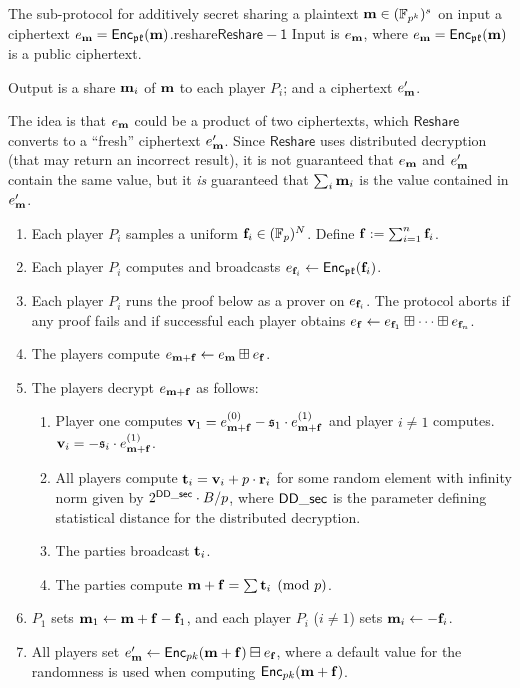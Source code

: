 \begin{Boxfig}{The sub-protocol for additively secret sharing a plaintext $\mathbf{m} \in ({\mathbb{F}}_{p^k})^s$ on input a ciphertext $e_{\mathbf{m}}=\mathsf{Enc}_{\mathfrak{pk}}(\mathbf{m})$.}{reshare}{$\mathsf{Reshare-1}$}
Input is $e_{\mathbf{m}}$, where $e_{\mathbf{m}}=\mathsf{Enc}_{\mathfrak{pk}}(\mathbf{m})$ is a public ciphertext.

Output is a share $\mathbf{m}_i$ of $\mathbf{m}$ to each player $P_i$; and a ciphertext $e'_{\mathbf{m}}$. 

The idea is that $e_{\mathbf{m}}$ could be a product of two ciphertexts, which
$\mathsf{Reshare}$ converts to a ``fresh'' ciphertext $e'_{\mathbf{m}}$. Since $\mathsf{Reshare}$ uses distributed decryption (that may return an incorrect result), it is not guaranteed that $e_{\mathbf{m}}$ and $e'_{\mathbf{m}}$ contain the same value, but it
{\em is} guaranteed that $\sum_i \mathbf{m}_i$ is the value contained in $e'_{\mathbf{m}}$.
\begin{enumerate}
\item Each player $P_i$ samples a uniform $\mathbf{f}_i\in ({\mathbb{F}}_p)^N$. Define $\mathbf{f}:=\sum_{i=1}^{n}\mathbf{f}_i$.
\item Each player $P_i$ computes and broadcasts $e_{\mathbf{f}_i}\leftarrow\mathsf{Enc}_{\mathfrak{pk}}(\mathbf{f}_i)$.\label{reshare:enc}
\item Each player $P_i$ runs the proof below as a prover on $e_{\mathbf{f}_i}$. The protocol aborts if any proof fails
and if successful each player obtains $e_{\mathbf{f}}\leftarrow e_{\mathbf{f}_1}\boxplus\dots\boxplus e_{\mathbf{f}_n}$.
\item The players compute $e_{\mathbf{m}+\mathbf{f}}\leftarrow e_{\mathbf{m}}\boxplus e_{\mathbf{f}}$.
\item The players decrypt $e_{\mathbf{m}+\mathbf{f}}$ as follows:
\begin{enumerate}
\item Player one computes $\mathbf{v}_1 = e_{\mathbf{m}+\mathbf{f}}^{(0)}-\mathfrak{s}_1 \cdot e_{\mathbf{m}+\mathbf{f}}^{(1)}$ and player $i \ne 1$ computes.
$\mathbf{v}_i = -\mathfrak{s}_i \cdot e_{\mathbf{m}+\mathbf{f}}^{(1)}$.
\item All players compute $\mathbf{t}_i = \mathbf{v}_i + p \cdot \mathbf{r}_i$ for some random element
with infinity norm given by $2^{\mathsf{DD\_sec}} \cdot B/p$, where $\mathsf{DD\_sec}$ is the parameter defining statistical distance for the distributed decryption.
\item The parties broadcast $\mathbf{t}_i$.
\item The parties compute $\mathbf{m}+\mathbf{f} = \sum \mathbf{t}_i \pmod{p}$.
\end{enumerate}
\item $P_1$ sets $\mathbf{m}_1\leftarrow \mathbf{m}+\mathbf{f}-\mathbf{f}_1$, and
each player $P_i$ ($i\neq 1$) sets $\mathbf{m}_i\leftarrow -\mathbf{f}_i$.
\item All players set $e'_{\mathbf{m}} \leftarrow \mathsf{Enc}_{pk}(\mathbf{m}+\mathbf{f})\boxminus e_{\mathbf{f}}$,
where a default value for the randomness is used when computing $\mathsf{Enc}_{pk}(\mathbf{m}+\mathbf{f})$.
\end{enumerate}
\end{Boxfig}


